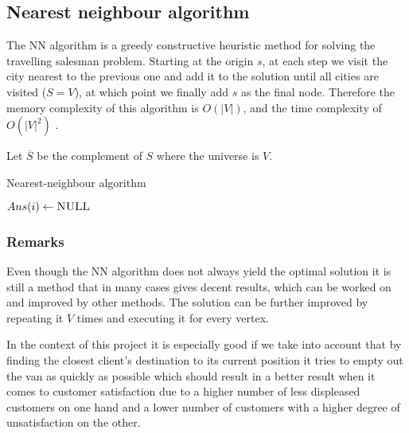 \subsection{Nearest neighbour algorithm} \label{algorithm-tsp-nn}
The \acrfull*{NN} algorithm is a \gls{greedy} \gls{constructive} heuristic method for solving the travelling salesman problem.
Starting at the origin $s$, at each step we visit the city nearest to the previous one and add it to the solution until all cities are visited ($S = V$), at which point we finally add $s$ as the final node.
Therefore the memory complexity of this algorithm is $O(|V|)$, and the time complexity of $O(|V|^{2})$ \cite{reinelt}.\par
Let $\overline{S}$ be the complement of $S$ where the universe is $V$.
\begin{algorithm}[h]
    \caption{Nearest-neighbour algorithm}
    \label{alg:nearest neighbour}
    \begin{algorithmic}[1]
             {$Ans(i) \gets \textsc{NULL}$}
            \EndFor
            \EndFor
            \State {}
        \EndFunction
    \end{algorithmic}
\end{algorithm}
\subsubsection{Remarks}
Even though the \acrlong*{NN} algorithm does not always yield the optimal solution it is still a method that in many cases gives decent results, which can be worked on and improved by other methods.
The solution can be further improved by repeating it $V$ times and executing it for every vertex.\par
In the context of this project it is especially good if we take into account that by finding the closest client's destination to its current position it tries to empty out the van as quickly as possible
which should result in a better result when it comes to customer satisfaction due to a higher number of less displeased customers on one hand and a lower number of customers with a higher degree of unsatisfaction on the other.
\\
